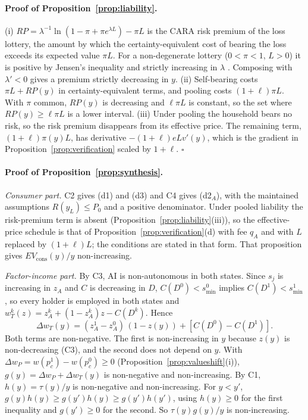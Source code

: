 \documentclass[12pt]{article}
\theoremstyle{remark}
\begin{document}
\paragraph{Proof of Proposition~\ref{prop:liability}.} (i) $RP=\lambda^{-1}\ln(1-\pi+\pi e^{\lambda L})-\pi L$ is the CARA risk premium of the loss lottery, the amount by which the certainty-equivalent cost of bearing the loss exceeds its expected value $\pi L$. For a non-degenerate lottery ($0<\pi<1$, $L>0$) it is positive by Jensen's inequality and strictly increasing in $\lambda$ \citep{pratt1964risk}. Composing with $\lambda'<0$ gives a premium strictly decreasing in $y$. (ii) Self-bearing costs $\pi L+RP(y)$ in certainty-equivalent terms, and pooling costs $(1+\ell)\pi L$. With $\pi$ common, $RP(y)$ is decreasing and $\ell\pi L$ is constant, so the set where $RP(y)\ge\ell\pi L$ is a lower interval. (iii) Under pooling the household bears no risk, so the risk premium disappears from its effective price. The remaining term, $(1+\ell)\pi(y)L$, has derivative $-(1+\ell)eLv'(y)$, which is the gradient in Proposition~\ref{prop:verification} scaled by $1+\ell$. $\square$

\paragraph{Proof of Proposition~\ref{prop:synthesis}.} \emph{Consumer part.} C2 gives (d1) and (d3) and C4 gives (d2$_A$), with the maintained assumptions $R(y_L)\le P_0$ and a positive denominator. Under pooled liability the risk-premium term is absent (Proposition~\ref{prop:liability}(iii)), so the effective-price schedule is that of Proposition~\ref{prop:verification}(d) with fee $q_A$ and with $L$ replaced by $(1+\ell)L$; the conditions are stated in that form. That proposition gives $EV_{\text{cons}}(y)/y$ non-increasing.

\emph{Factor-income part.} By C3, AI is non-autonomous in both states. Since $s_j$ is increasing in $z_A$ and $C$ is decreasing in $D$, $C(D^0)<s^0_{\min}$ implies $C(D^1)<s^1_{\min}$, so every holder is employed in both states and $w_T^k(z)=z_A^k+(1-z_A^k)z-C(D^k)$. Hence
\[
\Delta w_T(y)=(z_A^1-z_A^0)\,(1-z(y))+[C(D^0)-C(D^1)].
\]
Both terms are non-negative. The first is non-increasing in $y$ because $z(y)$ is non-decreasing (C3), and the second does not depend on $y$. With $\Delta w_P=w(p_c^1)-w(p_c^0)\ge0$ (Proposition~\ref{prop:valueshift}(i)), $g(y)=\Delta w_P+\Delta w_T(y)$ is non-negative and non-increasing. By C1, $h(y)=\tau(y)/y$ is non-negative and non-increasing. For $y<y'$, $g(y)h(y)\ge g(y')h(y)\ge g(y')h(y')$, using $h(y)\ge0$ for the first inequality and $g(y')\ge0$ for the second. So $\tau(y)g(y)/y$ is non-increasing.
\end{document}
